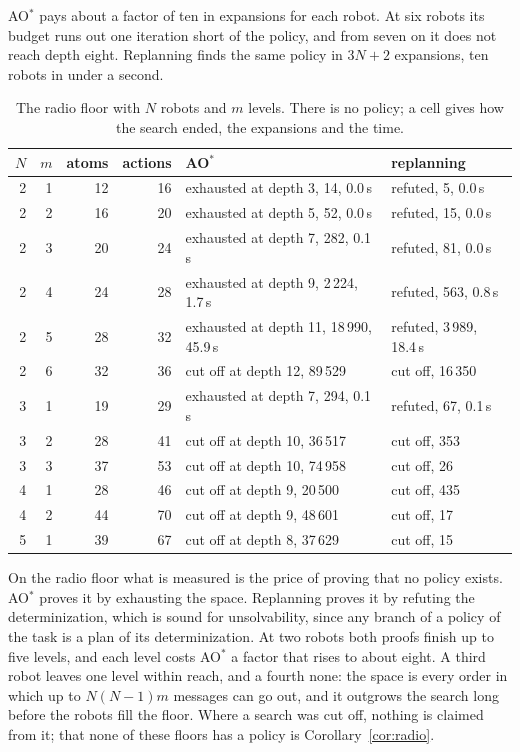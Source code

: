 \documentclass[11pt,a4paper]{article}
\theoremstyle{definition}
\begin{document}
\noindent
AO$^*$ pays about a factor of ten in expansions for each robot. At six robots
its budget runs out one iteration short of the policy, and from seven on it
does not reach depth eight. Replanning finds the same policy in $3N + 2$
expansions, ten robots in under a second.

\begin{table}[H]
\centering\small
\caption{The radio floor with $N$ robots and $m$ levels. There is no policy;
a cell gives how the search ended, the expansions and the time.}
\label{tab:scale-radio}
\begin{tabular}{@{}r r r r l l@{}}
\toprule
$N$ & $m$ & atoms & actions & AO$^*$ & replanning \\
\midrule
2 & 1 & 12 & 16 & exhausted at depth 3, 14, 0.0\,s & refuted, 5, 0.0\,s \\
2 & 2 & 16 & 20 & exhausted at depth 5, 52, 0.0\,s & refuted, 15, 0.0\,s \\
2 & 3 & 20 & 24 & exhausted at depth 7, 282, 0.1\,s & refuted, 81, 0.0\,s \\
2 & 4 & 24 & 28 & exhausted at depth 9, 2\,224, 1.7\,s & refuted, 563, 0.8\,s \\
2 & 5 & 28 & 32 & exhausted at depth 11, 18\,990, 45.9\,s & refuted, 3\,989, 18.4\,s \\
2 & 6 & 32 & 36 & cut off at depth 12, 89\,529 & cut off, 16\,350 \\
3 & 1 & 19 & 29 & exhausted at depth 7, 294, 0.1\,s & refuted, 67, 0.1\,s \\
3 & 2 & 28 & 41 & cut off at depth 10, 36\,517 & cut off, 353 \\
3 & 3 & 37 & 53 & cut off at depth 10, 74\,958 & cut off, 26 \\
4 & 1 & 28 & 46 & cut off at depth 9, 20\,500 & cut off, 435 \\
4 & 2 & 44 & 70 & cut off at depth 9, 48\,601 & cut off, 17 \\
5 & 1 & 39 & 67 & cut off at depth 8, 37\,629 & cut off, 15 \\
\bottomrule
\end{tabular}
\end{table}

\noindent
On the radio floor what is measured is the price of proving that no policy
exists. AO$^*$ proves it by exhausting the space. Replanning proves it by
refuting the determinization, which is sound for unsolvability, since any
branch of a policy of the task is a plan of its determinization. At two robots
both proofs finish up to five levels, and each level costs AO$^*$ a factor that
rises to about eight. A third robot leaves one level within reach, and a fourth
none: the space is every order in which up to $N(N-1)m$ messages can go out,
and it outgrows the search long before the robots fill the floor. Where a
search was cut off, nothing is claimed from it; that none of these floors has a
policy is Corollary~\ref{cor:radio}.
\end{document}
